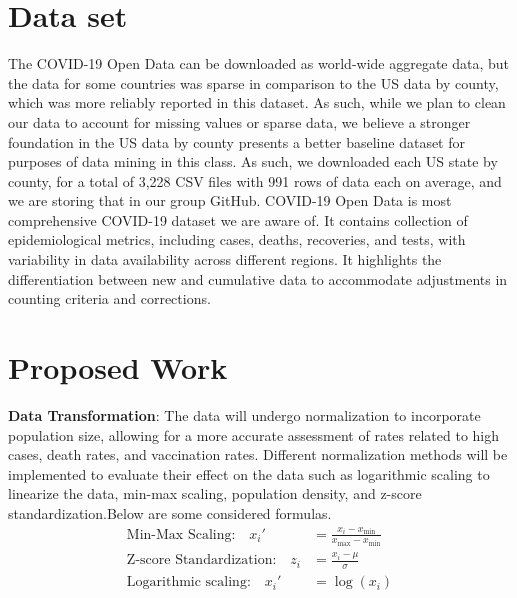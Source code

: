 \documentclass[manuscript,screen,review]{acmart}
\begin{document}
\section{Data set}

The COVID-19 Open Data can be downloaded as world-wide aggregate data, but the data for some countries was sparse in comparison to the US data by county, which was more reliably reported in this dataset. As such, while we plan to clean our data to account for missing values or sparse data, we believe a stronger foundation in the US data by county presents a better baseline dataset for purposes of data mining in this class. As such, we downloaded each US state by county, for a total of 3,228 CSV files with 991 rows of data each on average, and we are storing that in our group GitHub. COVID-19 Open Data is most comprehensive COVID-19 dataset we are aware of. It contains collection of epidemiological metrics, including cases, deaths, recoveries, and tests, with variability in data availability across different regions. It highlights the differentiation between new and cumulative data to accommodate adjustments in counting criteria and corrections.

\section{Proposed Work}

\begin{comment}
    - classification: hot spots/zones for mortality, infection, death
    - geographical analysis: (need to pull in geospatial data) of the spread (potentially from areas identified as hot spots or areas that had recent high infection)
    - correlation: between temperature, humidity, etc
\end{comment}

\textbf{Data Transformation}: The data will undergo normalization to incorporate population size, allowing for a more accurate assessment of rates related to high cases, death rates, and vaccination rates. Different normalization methods will be implemented to evaluate their effect on the data such as logarithmic scaling to linearize the data, min-max scaling, population density, and z-score standardization.Below are some considered formulas.
\begin{align*}
\text{Min-Max Scaling:} \quad x_i' &= \frac{{x_i - x_{\text{min}}}}{{x_{\text{max}} - x_{\text{min}}}} \\
\text{Z-score Standardization:} \quad z_i &= \frac{{x_i - \mu}}{{\sigma}} \\
\text{Logarithmic scaling:} \quad x_i' &= \log(x_i) \\
\end{align*}
\end{document}
